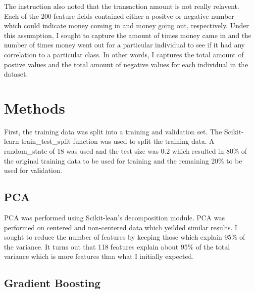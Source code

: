 \documentclass[11pt,letterpaper]{article}
\begin{document}

The instruction also noted that the transaction amount is not really relavent.
Each of the 200 feature fields contained either a positve or negative number
which could indicate money coming in and money going out, respectively.  Under
this assumption, I sought to capture the amount of times money came in and the
number of times money went out for a particular individual to see if it had any
correlation to a particular class.  In other words, I captures the total amount
of postive values and the total amount of negative values for each individual in
the dataset.  

\section{Methods}

First, the training data was split into a training and validation set.  The
Scikit-learn train\_test\_split function was used to split the training data.  A
random\_state of 18 was used and the test size was 0.2 which resulted in 80\% of
the original training data to be used for training and the remaining 20\% to be
used for validation.  

\subsection{PCA}
PCA was performed using Scikit-lean's decomposition module.  PCA was performed
on centered and non-centered data which yeilded similar results.  I sought to
reduce the number of features by keeping those which explain 95\% of the
variance.  It turns out that 118 features explain about 95\% of the total
variance which is more features than what I initially expected.   

\subsection{Gradient Boosting}
\end{document}
